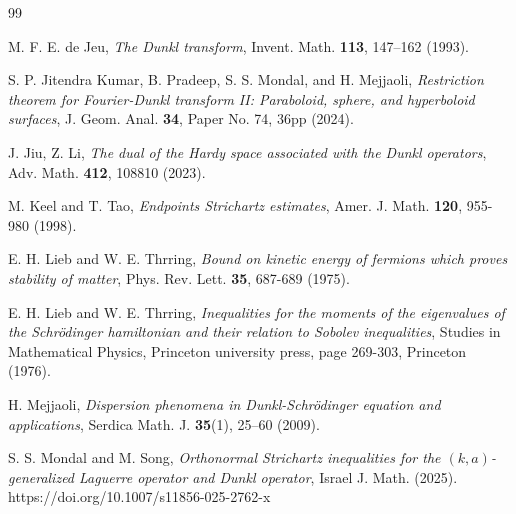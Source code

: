\documentclass[a4paper,11pt, reqno]{amsart}
\numberwithin{equation}{section}
\theoremstyle{plain}
\theoremstyle{definition}
\theoremstyle{remark}
\begin{document}
\begin{thebibliography}{99}

 M. F. E. de Jeu, \emph{The Dunkl transform}, Invent. Math. \textbf{113}, 147–162  (1993).

 S. P. Jitendra Kumar, B. Pradeep, S. S.   Mondal,  and H. Mejjaoli, \emph{Restriction theorem for Fourier-Dunkl transform II: Paraboloid, sphere, and hyperboloid surfaces}, J. Geom. Anal. \textbf{34}, Paper No. 74, 36pp (2024).

 J. Jiu, Z. Li, \emph{The dual of the Hardy space associated with the Dunkl operators}, Adv. Math. \textbf{412}, 108810 (2023).

 M. Keel and  T. Tao, \emph{Endpoints Strichartz estimates}, Amer. J. Math. \textbf{120}, 955-980 (1998).

  E. H. Lieb and   W. E. Thrring,  \emph{Bound on kinetic energy of fermions which proves stability of matter}, Phys. Rev. Lett. \textbf{35}, 687-689 (1975).
		
  E. H. Lieb and   W. E. Thrring, \emph{Inequalities for the moments of the eigenvalues of the Schr\"odinger hamiltonian and their relation to Sobolev inequalities}, Studies in Mathematical Physics, Princeton university press, page 269-303, Princeton (1976). 



 H. Mejjaoli, \emph{Dispersion phenomena in Dunkl-Schr\"{o}dinger equation and applications},
Serdica Math. J. \textbf{35}(1), 25–60 (2009).


 S. S. Mondal and  M. Song, \emph{Orthonormal Strichartz inequalities for the $(k,a)$-generalized Laguerre operator and Dunkl operator}, Israel J. Math. (2025). https://doi.org/10.1007/s11856-025-2762-x 


\end{thebibliography}
\end{document}
